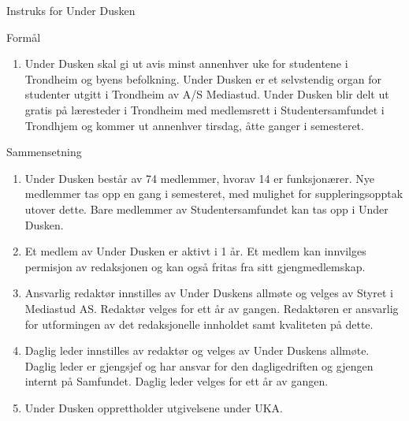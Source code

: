\documentclass[../fsbok.tex]{subfiles}
\begin{document}
\begin{instruks*}{Instruks for Under Dusken}

    \begin{instruksledd}{Formål}
        \begin{enumerate}
            \item Under Dusken skal gi ut avis minst annenhver uke for studentene i Trondheim og
                byens befolkning. Under Dusken er et selvstendig organ for studenter utgitt i Trondheim av A/S
                Mediastud. Under Dusken blir delt ut gratis på læresteder i Trondheim med medlemsrett i
                Studentersamfundet i Trondhjem og kommer ut annenhver tirsdag, åtte ganger i semesteret.
        \end{enumerate}
    \end{instruksledd}

    \begin{instruksledd}{Sammensetning}
        \begin{enumerate}
            \item Under Dusken består av 74 medlemmer, hvorav 14 er funksjonærer. Nye medlemmer tas
                opp en gang i semesteret, med mulighet for suppleringsopptak utover dette. Bare medlemmer av
                Studentersamfundet kan tas opp i Under Dusken.
            \item Et medlem av Under Dusken er aktivt i 1 år. Et medlem kan innvilges permisjon av
                redaksjonen og kan også fritas fra sitt gjengmedlemskap.
            \item Ansvarlig redaktør innstilles av Under Duskens allmøte og velges av Styret i
                Mediastud AS. Redaktør velges for ett år av gangen. Redaktøren er ansvarlig for utformingen av det
                redaksjonelle innholdet samt kvaliteten på dette.
            \item Daglig leder innstilles av redaktør og velges av Under Duskens allmøte.
                Daglig leder er gjengsjef og har ansvar for den dagligedriften og gjengen internt på Samfundet.
                Daglig leder velges for ett år av gangen.
            \item Under Dusken opprettholder utgivelsene under UKA.
        \end{enumerate}
    \end{instruksledd}


\end{instruks*}
\end{document}
